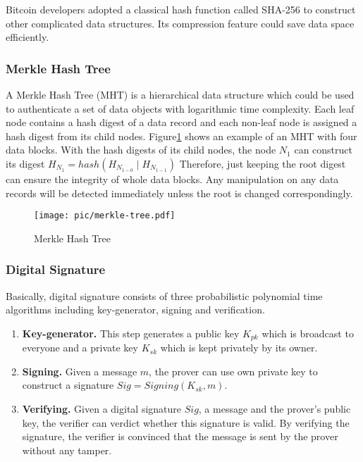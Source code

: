 \documentclass[conference]{IEEEtran}
\begin{document}
Bitcoin developers adopted a classical hash function called SHA-256 to construct other complicated data structures. Its compression feature could save data space efficiently.

\subsubsection{Merkle Hash Tree\cite{merkle1989certified}}
A Merkle Hash Tree (MHT) is a hierarchical data structure which could be used to authenticate a set of data objects with logarithmic time complexity.
%
Each leaf node contains a hash digest of a data record and each non-leaf node is assigned a hash digest from its child nodes.
%
Figure\ref{Merkle} shows an example of an MHT with four data blocks.
%
With the hash digests of its child nodes, the node $N_1$ can construct its digest  $H_{N_1} = hash(H_{N_{1-0}} \mid H_{N_{1-1}})$
%
Therefore, just keeping the root digest can ensure the integrity of whole data blocks.
%
Any manipulation on any data records will be detected immediately unless the root is changed correspondingly.

\begin{figure}[ht]
    \centering
    \texttt{[image: pic/merkle-tree.pdf]}
    \caption{Merkle Hash Tree}
    \label{Merkle}
\end{figure}

\subsubsection{Digital Signature}
Basically, digital signature consists of three probabilistic polynomial time algorithms including key-generator, signing and verification.

\begin{enumerate}
    \item \textbf{Key-generator.} This step generates a public key $K_{pk}$ which is broadcast to everyone and a private key $K_{sk}$ which is kept privately by its owner.
    \item \textbf{Signing.} Given a message $m$, the prover can use own private key to construct a signature $Sig = Signing(K_{sk},m)$.
    \item \textbf{Verifying.} Given a digital signature $Sig$, a message and the prover's public key, the verifier can verdict whether this signature is valid.
          By verifying the signature, the verifier is convinced that the message is sent by the prover without any tamper. 
\end{enumerate}
\end{document}
